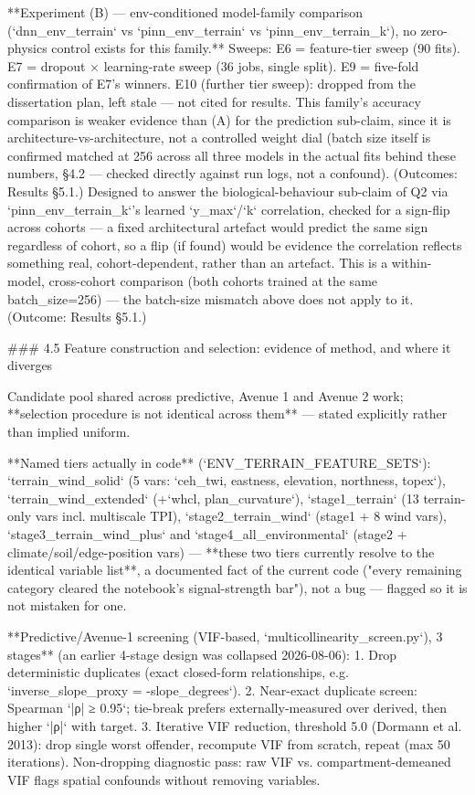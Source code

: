 \documentclass[11pt,a4paper]{report}
\begin{document}
**Experiment (B) — env-conditioned model-family comparison (`dnn_env_terrain` vs `pinn_env_terrain` vs `pinn_env_terrain_k`), no zero-physics control exists for this family.** Sweeps: E6 = feature-tier sweep (90 fits). E7 = dropout × learning-rate sweep (36 jobs, single split). E9 = five-fold confirmation of E7's winners. E10 (further tier sweep): dropped from the dissertation plan, left stale — not cited for results. This family's accuracy comparison is weaker evidence than (A) for the prediction sub-claim, since it is architecture-vs-architecture, not a controlled weight dial (batch size itself is confirmed matched at 256 across all three models in the actual fits behind these numbers, §4.2 — checked directly against run logs, not a confound). (Outcomes: Results §5.1.)
Designed to answer the biological-behaviour sub-claim of Q2 via `pinn_env_terrain_k`'s learned `y_max`/`k` correlation, checked for a sign-flip across cohorts — a fixed architectural artefact would predict the same sign regardless of cohort, so a flip (if found) would be evidence the correlation reflects something real, cohort-dependent, rather than an artefact. This is a within-model, cross-cohort comparison (both cohorts trained at the same batch_size=256) — the batch-size mismatch above does not apply to it. (Outcome: Results §5.1.)

### 4.5 Feature construction and selection: evidence of method, and where it diverges

Candidate pool shared across predictive, Avenue 1 and Avenue 2 work; **selection procedure is not identical across them** — stated explicitly rather than implied uniform.

**Named tiers actually in code** (`ENV_TERRAIN_FEATURE_SETS`): `terrain_wind_solid` (5 vars: `ceh_twi, eastness, elevation, northness, topex`), `terrain_wind_extended` (+`whcl, plan_curvature`), `stage1_terrain` (13 terrain-only vars incl. multiscale TPI), `stage2_terrain_wind` (stage1 + 8 wind vars), `stage3_terrain_wind_plus` and `stage4_all_environmental` (stage2 + climate/soil/edge-position vars) — **these two tiers currently resolve to the identical variable list**, a documented fact of the current code ("every remaining category cleared the notebook's signal-strength bar"), not a bug — flagged so it is not mistaken for one.

**Predictive/Avenue-1 screening (VIF-based, `multicollinearity_screen.py`), 3 stages** (an earlier 4-stage design was collapsed 2026-08-06):
1. Drop deterministic duplicates (exact closed-form relationships, e.g. `inverse_slope_proxy = -slope_degrees`).
2. Near-exact duplicate screen: Spearman `|ρ| ≥ 0.95`; tie-break prefers externally-measured over derived, then higher `|ρ|` with target.
3. Iterative VIF reduction, threshold 5.0 (Dormann et al. 2013): drop single worst offender, recompute VIF from scratch, repeat (max 50 iterations).
Non-dropping diagnostic pass: raw VIF vs. compartment-demeaned VIF flags spatial confounds without removing variables.
\end{document}

